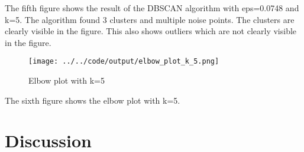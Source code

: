 \documentclass[twoside, a4paper, fleqn, reqno]{article}
\begin{document}
The fifth figure shows the result of the DBSCAN algorithm with eps=0.0748 and k=5.
The algorithm found 3 clusters and multiple noise points.
The clusters are clearly visible in the figure.
This also shows outliers which are not clearly visible in the figure.

\begin {figure}[H]
	\centering
	\texttt{[image: ../../code/output/elbow\_plot\_k\_5.png]}
	\caption{Elbow plot with k=5}
	\label{fig:elbow_plot_k_5}
\end {figure}

The sixth figure shows the elbow plot with k=5.

\section{Discussion}
\end{document}
